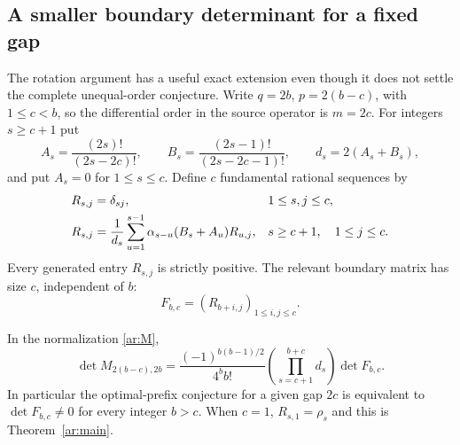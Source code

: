 \subsection{A smaller boundary determinant for a fixed gap}
\label{ar:general-gap}

The rotation argument has a useful exact extension even though it does
not settle the complete unequal-order conjecture. Write
$q=2b$, $p=2(b-c)$, with $1\le c<b$, so the differential order in
the source operator is $m=2c$. For integers $s\ge c+1$ put
\[
 A_s=\frac{(2s)!}{(2s-2c)!},\qquad
 B_s=\frac{(2s-1)!}{(2s-2c-1)!},\qquad
 d_s=2(A_s+B_s),
\]
and put $A_s=0$ for $1\le s\le c$. Define $c$ fundamental rational
sequences by
\begin{align}
 R_{s,j}&=\delta_{sj},&&1\le s,j\le c,\notag\\
 R_{s,j}&=\frac1{d_s}\sum_{u=1}^{s-1}
       \alpha_{s-u}(B_s+A_u)R_{u,j},
       &&s\ge c+1,\quad 1\le j\le c.
       \label{ar:fundamental}
\end{align}
Every generated entry $R_{s,j}$ is strictly positive. The relevant
boundary matrix has size $c$, independent of $b$:
\[
             F_{b,c}=(R_{b+i,j})_{1\le i,j\le c}.
\]

\begin{proposition}\label{ar:gap-det}
In the normalization \eqref{ar:M},
\begin{equation}\label{ar:gap-factor}
 \det M_{2(b-c),2b}
  =\frac{(-1)^{b(b-1)/2}}{4^bb!}
       \left(\prod_{s=c+1}^{b+c}d_s\right)\det F_{b,c}.
\end{equation}
In particular the optimal-prefix conjecture for a given gap $2c$
is equivalent to $\det F_{b,c}\ne0$ for every integer $b>c$.
When $c=1$, $R_{s,1}=\rho_s$ and this is
Theorem~\ref{ar:main}.
\end{proposition}

